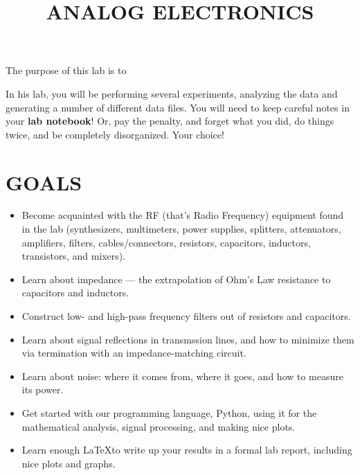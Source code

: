 \documentclass[11pt,preprint]{aastex}
\begin{document}
\def\simlt{\lower.5ex\hbox{$\; \buildrel < \over \sim \;$}}
\def\simgt{\lower.5ex\hbox{$\; \buildrel > \over \sim \;$}}

\title{ANALOG ELECTRONICS}

\tableofcontents


	The purpose of this lab is to %

In his lab, you will be performing several experiments, analyzing the
data and generating a number of different data files. You will need to
keep careful notes in your {\bf lab notebook}! Or, pay the penalty, and
forget what you did, do things twice, and be completely
disorganized. Your choice!

\section*{GOALS}

\begin{itemize}

\item Become acquainted with the RF (that's Radio Frequency) equipment
found in the lab (synthesizers, multimeters,
power supplies, splitters, attenuators, amplifiers, filters,
cables/connectors, resistors, capacitors, inductors, transistors, and mixers).

\item Learn about impedance --- the extrapolation of Ohm's Law resistance
to capacitors and inductors.

\item Construct low- and high-pass frequency filters out of resistors 
and capacitors.

\item Learn about signal reflections in transmssion lines, and how to
minimize them via termination with an impedance-matching circuit.

\item Learn about noise: where it comes from, where it goes, and how
to measure its power.

\item Get started with our programming language, Python, using it for the
  mathematical analysis, signal processing, and making nice plots.

\item Learn enough \LaTeX to write up your results in a formal lab report,
  including nice plots and graphs.

\end{itemize}
\end{document}
